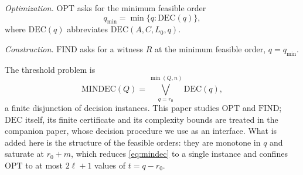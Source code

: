 ﻿\documentclass[journal]{IEEEtran}
\theoremstyle{plainn}
\theoremstyle{remark}
\begin{document}
\emph{Optimization.} $\mathrm{OPT}$ asks for the minimum feasible order
\begin{equation*}
q_{\min}=\min\{q:\mathrm{DEC}(q)\},
\end{equation*}
where $\mathrm{DEC}(q)$ abbreviates $\mathrm{DEC}(A,C,L_0,q)$.

\emph{Construction.} $\mathrm{FIND}$ asks for a witness $R$ at the minimum feasible
order, $q=q_{\min}$.

The threshold problem is
\begin{equation}\label{eq:mindec}
\mathrm{MINDEC}(Q)=\bigvee_{q=r_0}^{\min(Q,n)}\mathrm{DEC}(q),
\end{equation}
a finite disjunction of decision instances. This paper studies $\mathrm{OPT}$ and
$\mathrm{FIND}$; $\mathrm{DEC}$ itself, its finite certificate and its complexity bounds are treated in
the companion paper, whose decision procedure we use as an interface. What is added here is the
structure of the feasible orders: they are monotone in $q$ and saturate at $r_0+m$, which reduces
\eqref{eq:mindec} to a single instance and confines $\mathrm{OPT}$ to at most $2\ell+1$ values of
$t=q-r_0$.
\end{document}
